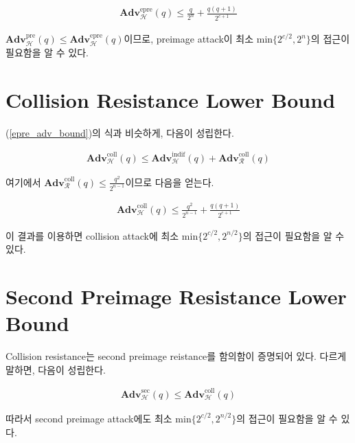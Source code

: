 \documentclass{article}
\newcommand{\adv}{\mathbf{Adv}}
\begin{document}
  \begin{align*}
    \adv^\text{epre}_\mathcal{H}(q) \leq \frac{q}{2^n} + \frac{q(q + 1)}{2^{c + 1}}
  \end{align*}

  \(\adv^\text{pre}_\mathcal{H}(q) \leq \adv^\text{epre}_\mathcal{H}(q)\)이므로\cite{rogaway_cryptographic_2004}, preimage attack이 최소 \(\mathrm{min}\{2^{c/2}, 2^n\}\)의 접근이 필요함을 알 수 있다.

  \section{Collision Resistance Lower Bound}
  (\ref{epre_adv_bound})의 식과 비슷하게, 다음이 성립한다.

  \begin{align*}
    \adv^\text{coll}_\mathcal{H}(q) \leq \adv^\text{indif}_\mathcal{H}(q) + \adv^\text{coll}_\mathcal{R}(q)
  \end{align*}

  여기에서 \(\adv^\text{coll}_\mathcal{R}(q) \leq \frac{q^2}{2^{n - 1}}\)이므로 다음을 얻는다.

  \begin{align*}
    \adv^\text{coll}_\mathcal{H}(q) \leq \frac{q^2}{2^{n - 1}} + \frac{q(q + 1)}{2^{c + 1}}
  \end{align*}

  이 결과를 이용하면 collision attack에 최소 \(\mathrm{min}\{2^{c/2}, 2^{n/2}\}\)의 접근이 필요함을 알 수 있다.

  \section{Second Preimage Resistance Lower Bound}
  Collision resistance는 second preimage reistance를 함의함이 증명되어 있다.\cite{rogaway_cryptographic_2004} 다르게 말하면, 다음이 성립한다.

  \begin{align*}
    \adv^\text{sec}_\mathcal{H}(q) \leq \adv^\text{coll}_\mathcal{H}(q)
  \end{align*}

  따라서 second preimage attack에도 최소 \(\mathrm{min}\{2^{c/2}, 2^{n/2}\}\)의 접근이 필요함을 알 수 있다.
  \printbibliography
\end{document}
